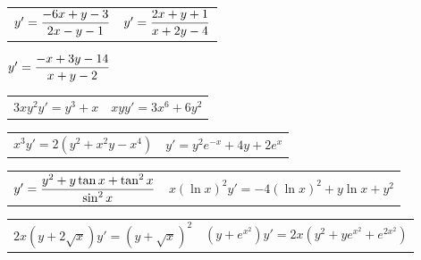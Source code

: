 \begin{exerciselist}

  \begin{tabular}[t]{@{}p{168pt}@{}p{168pt}}
    \item\label{exer:2.4.41} $y'=\displaystyle\frac{-6x+y-3}{2x-y-1}$ &
    \item\label{exer:2.4.42}\vspace*{10pt} $y'=\displaystyle\frac{2x+y+1}{x+2y-4}$
  \end{tabular}

  \item\label{exer:2.4.43} $y'=\displaystyle\frac{-x+3y-14}{x+y-2}$


  \begin{tabular}[t]{@{}p{168pt}@{}p{168pt}}
    \item\label{exer:2.4.44} $3xy^{2}y'=y^{3}+x$ & \vspace*{10pt}
    \item\label{exer:2.4.45} $xyy'=3x^{6}+6y^{2}$
  \end{tabular}

  \begin{tabular}[t]{@{}p{168pt}@{}p{168pt}}
    \item\label{exer:2.4.46} $x^{3}y'=2(y^{2}+x^{2}y-x^{4})$ &
    \item\label{exer:2.4.47} $y'=y^{2}e^{-x}+4y+2e^{x}$
  \end{tabular}

  \begin{tabular}[t]{@{}p{168pt}@{}p{168pt}}
    \item\label{exer:2.4.48} $y'=\displaystyle\frac{y^{2}+y\tan x+\tan^{2}x}{\sin^{2}x}$ &
    \item\label{exer:2.4.49} $x(\ln x)^{2}y'=-4(\ln x)^{2}+y\ln x+y^{2}$
  \end{tabular}

  \begin{tabular}[t]{@{}p{168pt}@{}p{168pt}}
    \item\label{exer:2.4.50} $2x(y+2\sqrt{x})y'=(y+\sqrt{x})^{2}$ &
    \item\label{exer:2.4.51} $(y+e^{x^{2}})y'=2x(y^{2}+ye^{x^{2}}+e^{2x^{2}})$
  \end{tabular}


\end{exerciselist}
